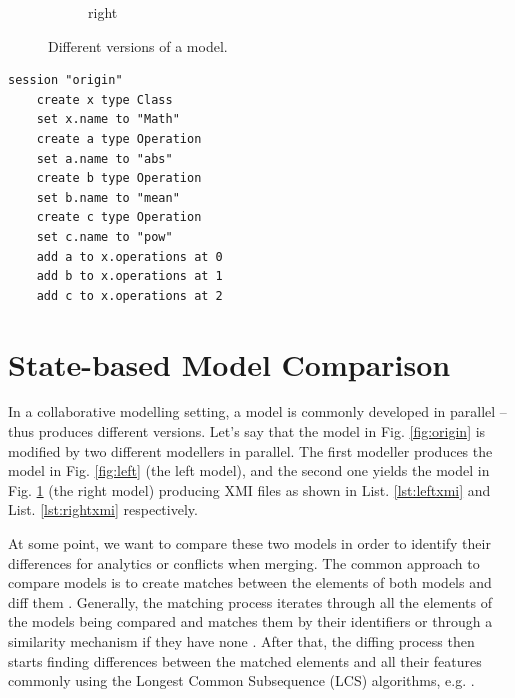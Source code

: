 \documentclass{jot}
\begin{document}
\begin{minipage}[t]{0.59\linewidth}
\begin{figure}[H]
\begin{subfigure}[t]{0.2\linewidth}
            \caption{right}
            \label{fig:right}
        \end{subfigure}
        \hfill
        \label{fig:versions}
        \caption{Different versions of a model.}
    \end{figure}
\end{minipage}
\hfill
\begin{minipage}[t]{0.39\linewidth}
    \begin{lstlisting}[style=eol,caption={The pseudo-formatted CBP of the model in Fig. \ref{fig:origin}.},label=lst:origincbp]
    session "origin"
    create x type Class
    set x.name to "Math" 
    create a type Operation
    set a.name to "abs" 
    create b type Operation
    set b.name to "mean" 
    create c type Operation
    set c.name to "pow" 
    add a to x.operations at 0
    add b to x.operations at 1
    add c to x.operations at 2
    \end{lstlisting}
\end{minipage}

\vspace{-5pt}
\section{State-based Model Comparison}
\label{sec:model_comparison}

\vspace{-5pt}
In a collaborative modelling setting, a model is commonly developed in parallel -- thus produces different versions. Let's say that the model in Fig. \ref{fig:origin} is modified by two different modellers in parallel. The first modeller produces the model in Fig. \ref{fig:left} (the left model), and the second one yields the model in Fig. \ref{fig:right} (the right model) producing XMI files as shown in List. \ref{lst:leftxmi} and List. \ref{lst:rightxmi} respectively.

At some point, we want to compare these two models in order to identify their differences for analytics or conflicts when merging. The common approach to compare models is to create matches between the elements of both models and diff them \cite{DBLP:conf/sfm/BroschKLSWW12,emfcompare2018developer}. Generally, the matching process iterates through all the elements of the models being compared and matches them by their identifiers or through a similarity mechanism if they have none \cite{DBLP:conf/sfm/BroschKLSWW12,emfcompare2018developer}. After that, the diffing process then starts finding differences between the matched elements and all their features commonly using the Longest Common Subsequence (LCS) algorithms, e.g. \cite{DBLP:journals/algorithmica/Meyers86}. 
\end{document}
